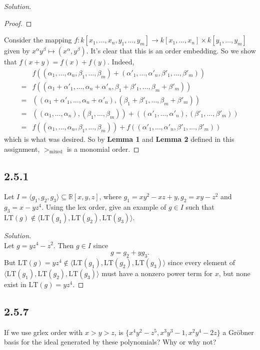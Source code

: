 \documentclass[]{article}
\newcommand\<{\langle}
\renewcommand\>{\rangle}
\newcommand{\RR}{\ensuremath{\mathbb{R}}}
\newenvironment{solution}
{
	\begin{proof}[Solution] \text{ }
		\\
	}
	{
	\end{proof}
}
\begin{document}
\begin{solution}
\begin{proof}
	\end{proof}
	Consider the mapping $f : k[x_1,\dots,x_n,y_1,\dots,y_m] \to k[x_1,\dots,x_n] \times k[y_1,\dots,y_m]$ given by $x^\alpha y^\beta \mapsto (x^\alpha, y^\beta)$. It's clear that this is an order embedding. So we show that $f(x + y) = f(x) + f(y)$. Indeed,
	\begin{align*}
		&f\left(\left(\alpha_1,\dots,\alpha_n,\beta_1,\dots,\beta_m\right) + \left(\alpha'_1,\dots,\alpha'_n,\beta'_1,\dots,\beta'_m\right)\right) \\
		= &f\left(\left(\alpha_1 + \alpha'_1,\dots,\alpha_n + \alpha'_n,\beta_1 + \beta'_1,\dots,\beta_m + \beta'_m\right)\right) \\
		= &\left(\left(\alpha_1 + \alpha'_1,\dots,\alpha_n + \alpha'_n\right), \left(\beta_1 + \beta'_1,\dots,\beta_m + \beta'_m\right)\right) \\
		= &\left(\left(\alpha_1,\dots,\alpha_n\right), \left(\beta_1,\dots,\beta_m\right)\right) + \left(\left(\alpha'_1,\dots,\alpha'_n\right), \left(\beta'_1,\dots,\beta'_m\right)\right) \\
		= &f\left(\left(\alpha_1,\dots,\alpha_n, \beta_1,\dots,\beta_m\right)\right) + f\left(\left(\alpha'_1,\dots,\alpha'_n, \beta'_1,\dots,\beta'_m\right)\right)
	\end{align*}
	which is what was desired. So by \textbf{Lemma 1} and \textbf{Lemma 2} defined in this assignment, $>_\text{mixed}$ is a monomial order.
\end{solution}

\subsection*{2.5.1} Let $I = \<g_1,g_2,g_3\> \subseteq \RR[x,y,z]$, where $g_1 = xy^2 - xz + y, g_2 = xy - z^2$ and $g_3 = x - yz^4$. Using the lex order, give an example of $g \in I$ such that $\text{LT}(g) \notin \<\text{LT}(g_1), \text{LT}(g_2), \text{LT}(g_3)\>$.
\begin{solution}
	Let $g = yz^4 - z^2$. Then $g \in I$ since
	$$
		g = g_2 + yg_3.
	$$
	But $\text{LT}(g) = yz^4 \notin \<\text{LT}(g_1), \text{LT}(g_2), \text{LT}(g_3)\>$ since every element of $\<\text{LT}(g_1), \text{LT}(g_2), \text{LT}(g_3)\>$ must have a nonzero power term for $x$, but none exist in $\text{LT}(g) = yz^4$.
\end{solution}

\subsection*{2.5.7} If we use grlex order with $x > y > z$, is $\{x^4y^2-z^5,x^3y^3-1,x^2y^4-2z\}$ a Gröbner basis for the ideal generated by these polynomials? Why or why not?
\end{document}
